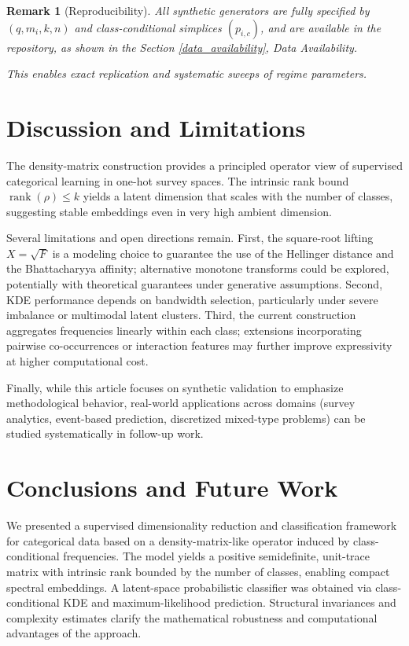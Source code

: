 \documentclass[preprint,11pt]{elsarticle}
\newtheorem{Remark}[Theorem]{Remark}
\newcommand{\rank}{\operatorname{rank}}
\begin{document}
\begin{Remark}[Reproducibility]
All synthetic generators are fully specified by $(q,m_i,k,n)$ and class-conditional simplices $(p_{i,c})$,
and are available in the repository, as shown in the Section \ref{data_availability}, Data Availability.

This enables exact replication and systematic sweeps of regime parameters.
\end{Remark}

\section{Discussion and Limitations}
The density-matrix construction provides a principled operator view of supervised categorical learning in one-hot survey spaces.
The intrinsic rank bound $\rank(\rho)\le k$ yields a latent dimension that scales with the number of classes, suggesting stable embeddings even in very high ambient dimension.

Several limitations and open directions remain.
First, the square-root lifting $X=\sqrt{F}$ is a modeling choice to guarantee the use of the Hellinger distance and the Bhattacharyya affinity; alternative monotone transforms could be explored, potentially with theoretical guarantees under generative assumptions.
Second, KDE performance depends on bandwidth selection, particularly under severe imbalance or multimodal latent clusters.
Third, the current construction aggregates frequencies linearly within each class; extensions incorporating pairwise co-occurrences or interaction features may further improve expressivity at higher computational cost.

Finally, while this article focuses on synthetic validation to emphasize methodological behavior, real-world applications across domains (survey analytics, event-based prediction, discretized mixed-type problems) can be studied systematically in follow-up work.

\section{Conclusions and Future Work}
We presented a supervised dimensionality reduction and classification framework for categorical data based on a density-matrix-like operator induced by class-conditional frequencies.
The model yields a positive semidefinite, unit-trace matrix with intrinsic rank bounded by the number of classes, enabling compact spectral embeddings.
A latent-space probabilistic classifier was obtained via class-conditional KDE and maximum-likelihood prediction.
Structural invariances and complexity estimates clarify the mathematical robustness and computational advantages of the approach.
\end{document}
